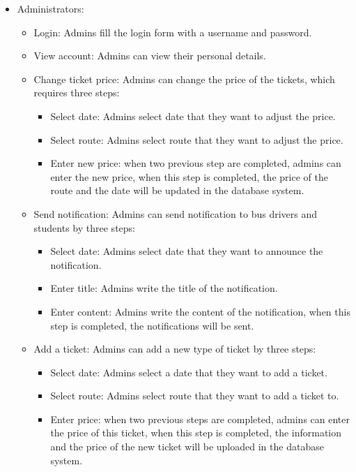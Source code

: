 \begin{itemize}
    \item Administrators:
        \begin{itemize}
            \item Login: Admins fill the login form with a username and password. 
            \item View account: Admins can view their personal details. 
            \item Change ticket price: Admins can change the price of the tickets, which requires three steps:
                \begin{itemize}
                    \item Select date: Admins select date that they want to adjust the price. 
                    \item Select route: Admins select route that they want to adjust the price.
                    \item Enter new price: when two previous step are completed, admins can enter the new price, when this step is completed, the price of the route and the date will be updated in the database system.
                \end{itemize}
            \item Send notification: Admins can send notification to bus drivers and students by three steps:
                \begin{itemize}
                    \item Select date: Admins select date that they want to announce the notification. 
                    \item Enter title: Admins write the title of the notification.
                    \item Enter content: Admins write the content of the notification, when this step is completed, the notifications will be sent.
                \end{itemize}
            \item Add a ticket: Admins can add a new type of ticket by three steps:
                \begin{itemize}
                    \item Select date: Admins select a date that they want to add a ticket.
                    \item Select route:  Admins select route that they want to add a ticket to.
                    \item Enter price: when two previous steps are completed, admins can enter the price of this ticket, when this step is completed, the information and the price of the new ticket will be uploaded in the database system.

\end{itemize}
\end{itemize}
\end{itemize}
